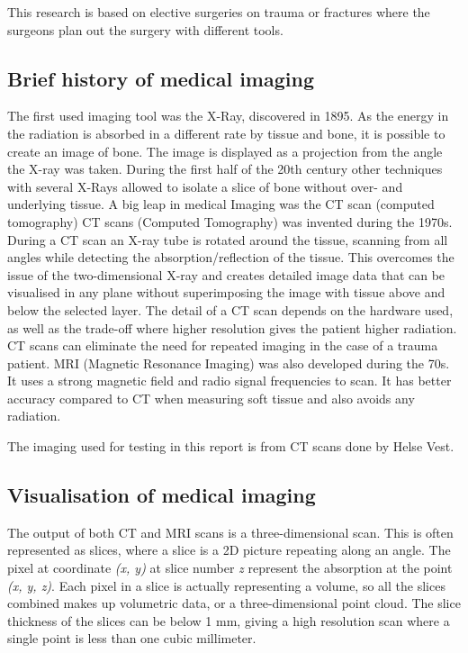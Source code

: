 \documentclass[a4paper]{report}
\begin{document}
This research is based on elective surgeries on trauma or fractures where the surgeons plan out the surgery with different tools. 

\subsection{Brief history of medical imaging}
The first used imaging tool was the X-Ray, discovered in 1895\cite{hamblen_outline_2010}\cite{suetens_fundamentals_2017}. As the energy in the radiation is absorbed in a different rate by tissue and bone, it is possible to create an image of bone. The image is displayed as a projection from the angle the X-ray was taken. During the first half of the 20th century other techniques with several X-Rays allowed to isolate a slice of bone without over- and underlying tissue. A big leap in medical Imaging was the CT scan (computed tomography)\cite{bradley_history_2008}
CT scans (Computed Tomography) was invented during the 1970s. During a CT scan an X-ray tube is rotated around the tissue, scanning from all angles while detecting the absorption/reflection of the tissue. This overcomes the issue of the two-dimensional X-ray and creates detailed image data that can be visualised in any plane without superimposing the image with tissue above and below the selected layer\cite{hamblen_outline_2010}. The detail of a CT scan depends on the hardware used, as well as the trade-off where higher resolution gives the patient higher radiation\cite{bradley_history_2008}. CT scans can eliminate the need for repeated imaging in the case of a trauma patient\cite{swiontkowski_manual_2013}.
MRI (Magnetic Resonance Imaging) was also developed during the 70s. It uses a strong magnetic field and radio signal frequencies to scan. It has better accuracy compared to CT when measuring soft tissue and also avoids any radiation.

The imaging used for testing in this report is from CT scans done by Helse Vest.

\subsection{Visualisation of medical imaging}
The output of both CT and MRI scans is a three-dimensional scan. This is often represented as slices, where a slice is a 2D picture repeating along an angle. The pixel at coordinate \emph{(x, y)} at slice number \emph{z} represent the absorption at the point \emph{(x, y, z)}\cite{chougule_conversions_2013}.
Each pixel in a slice is actually representing a volume, so all the slices combined makes up volumetric data, or a three-dimensional point cloud\cite{chougule_conversions_2013}.
The slice thickness of the slices can be below 1 mm, giving a high resolution scan where a single point is less than one cubic millimeter\cite{hamblen_outline_2010}.
\end{document}
